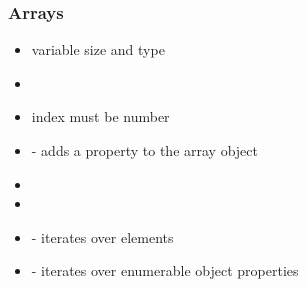 \begin{frame}[fragile] \frametitle{Arrays}
\begin{itemize}
  \item variable size and type
  \item {}
  \item index must be number
  \item {} - adds a property to the array object
  \item {}
  \item {}
  \item {} - iterates over elements
  \item {} - iterates over enumerable object properties
\end{itemize}
\end{frame}